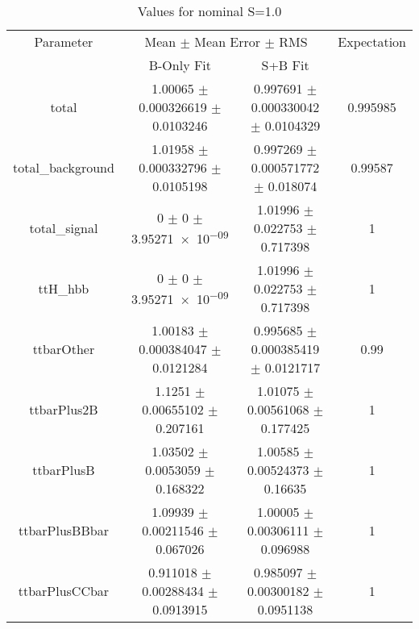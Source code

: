 \begin{table}
\centering
\caption{Values for nominal S=1.0}
\begin{tabular}{cccc}
\toprule
Parameter & \multicolumn{2}{c}{Mean $\pm$ Mean Error $\pm$ RMS} & Expectation\\
 & B-Only Fit & S+B Fit & \\
\midrule
total & \num{1.00065} $\pm$ \num{0.000326619} $\pm$ \num{0.0103246} & \num{0.997691} $\pm$ \num{0.000330042} $\pm$ \num{0.0104329} & \num{0.995985}\\
total\_background & \num{1.01958} $\pm$ \num{0.000332796} $\pm$ \num{0.0105198} & \num{0.997269} $\pm$ \num{0.000571772} $\pm$ \num{0.018074} & \num{0.99587}\\
total\_signal & \num{0} $\pm$ \num{0} $\pm$ \num{3.95271e-09} & \num{1.01996} $\pm$ \num{0.022753} $\pm$ \num{0.717398} & \num{1}\\
ttH\_hbb & \num{0} $\pm$ \num{0} $\pm$ \num{3.95271e-09} & \num{1.01996} $\pm$ \num{0.022753} $\pm$ \num{0.717398} & \num{1}\\
ttbarOther & \num{1.00183} $\pm$ \num{0.000384047} $\pm$ \num{0.0121284} & \num{0.995685} $\pm$ \num{0.000385419} $\pm$ \num{0.0121717} & \num{0.99}\\
ttbarPlus2B & \num{1.1251} $\pm$ \num{0.00655102} $\pm$ \num{0.207161} & \num{1.01075} $\pm$ \num{0.00561068} $\pm$ \num{0.177425} & \num{1}\\
ttbarPlusB & \num{1.03502} $\pm$ \num{0.0053059} $\pm$ \num{0.168322} & \num{1.00585} $\pm$ \num{0.00524373} $\pm$ \num{0.16635} & \num{1}\\
ttbarPlusBBbar & \num{1.09939} $\pm$ \num{0.00211546} $\pm$ \num{0.067026} & \num{1.00005} $\pm$ \num{0.00306111} $\pm$ \num{0.096988} & \num{1}\\
ttbarPlusCCbar & \num{0.911018} $\pm$ \num{0.00288434} $\pm$ \num{0.0913915} & \num{0.985097} $\pm$ \num{0.00300182} $\pm$ \num{0.0951138} & \num{1}\\
\bottomrule
\end{tabular}
\end{table}